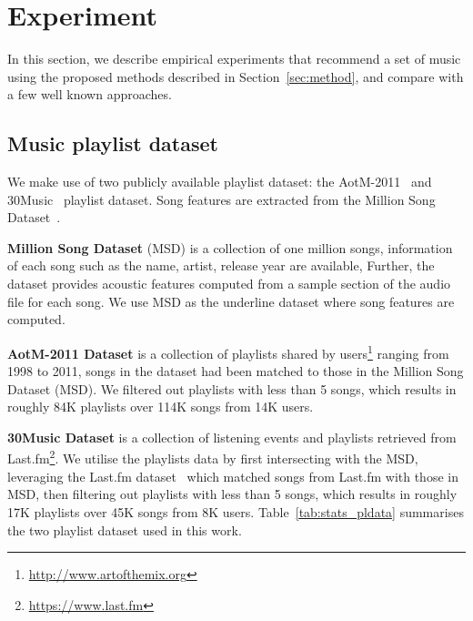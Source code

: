 \section{Experiment}
\label{sec:experiment}

In this section, we describe empirical experiments that recommend a set of music using the proposed methods
described in Section~\ref{sec:method}, and compare with a few well known approaches.

\subsection{Music playlist dataset}
We make use of two publicly available playlist dataset: the AotM-2011~\cite{mcfee2012hypergraph} and 30Music~\cite{30music2015} playlist dataset.
Song features are extracted from the Million Song Dataset~\cite{msd2011}.

{\bf Million Song Dataset} (MSD) is a collection of one million songs, information of each song such as the name, artist, release year are available,
Further, the dataset provides acoustic features computed from a sample section of the audio file for each song. %
We use MSD as the underline dataset where song features are computed.

{\bf AotM-2011 Dataset} is a collection of playlists shared by users\footnote{\url{http://www.artofthemix.org}} ranging from 1998 to 2011, 
songs in the dataset had been matched to those in the Million Song Dataset (MSD).
We filtered out playlists with less than 5 songs, which results in roughly 84K playlists over 114K songs from 14K users.

{\bf 30Music Dataset} is a collection of listening events and playlists retrieved from Last.fm\footnote{\url{https://www.last.fm}}.
We utilise the playlists data by first intersecting with the MSD, leveraging the Last.fm dataset~\cite{lastfmdataset} 
which matched songs from Last.fm with those in MSD, then filtering out playlists with less than 5 songs, 
which results in roughly 17K playlists over 45K songs from 8K users.
Table~\ref{tab:stats_pldata} summarises the two playlist dataset used in this work.
%
\begin{table}[!h]
\centering
\caption{Statistics of music playlist dataset}
\label{tab:stats_pldata}
\end{table}



